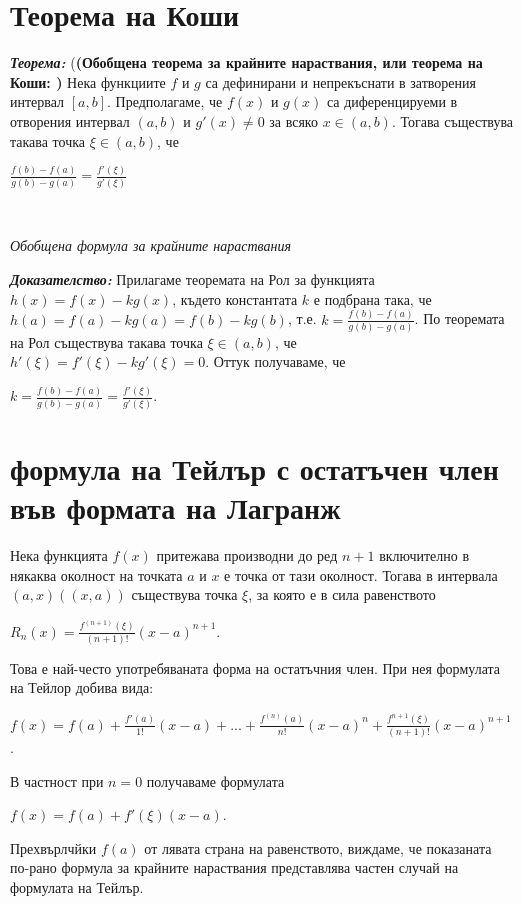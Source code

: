 \documentclass[11pt]{article} %
\newcommand{\italicBold}[1]{\textbf{\emph{#1}}}
\newcommand{\theorem}{\italicBold{Теорема: }}
\newcommand{\proof}{\italicBold{Доказателство: }}
\begin{document}
\section{Теорема на Коши}
\theorem (\textbf{(Обобщена теорема  за крайните нараствания, или теорема на Коши: )} Нека функциите $f$ и $g$ са дефинирани и непрекъснати в затворения интервал $[a,b]$. Предполагаме, че $f(x)$ и $g(x)$ са диференцируеми в отворения интервал $(a,b)$ и $g'(x) \neq 0$ за всяко $x \in (a,b)$. Тогава съществува такава точка $\xi \in (a,b)$, че \\
\centerline{$\frac{f(b)-f(a)}{g(b)-g(a)}=\frac{f'(\xi)}{g'(\xi)}$}\\
\centerline{\textit{Обобщена формула за крайните нараствания}}
\par
\proof Прилагаме теоремата на Рол за функцията $h(x)=f(x)-kg(x)$, където константата $k$ е подбрана така, че $h(a) = f(a)-kg(a)=f(b)-kg(b)$, т.е. $k = \frac{f(b)-f(a)}{g(b)-g(a)}$. По теоремата на Рол съществува такава точка $\xi \in (a,b)$, че \\$h'(\xi)=f'(\xi)-kg'(\xi)=0$. Оттук получаваме, че\\
\centerline{$k = \frac{f(b)-f(a)}{g(b)-g(a)}=\frac{f'(\xi)}{g'(\xi)}$.} 


\section{формула на Тейлър с остатъчен член във формата на Лагранж}
Нека функцията $f(x)$ притежава производни до ред $n+1$ включително в някаква околност на точката $a$ и $x$ е точка от тази околност. Тогава в интервала $(a,x)((x,a))$ съществува точка $\xi$, за която е в сила равенството \\
\centerline{$R_{n}(x) = \frac{f^{(n+1)}(\xi)}{(n+1)!}(x-a)^{n+1}$.}
\par
Това е най-често употребяваната форма на остатъчния член. При нея формулата на Тейлор добива вида:\\
\centerline{$f(x)=f(a)+\frac{f'(a)}{1!}(x-a)+...+\frac{f^{(n)}(a)}{n!}(x-a)^{n}+\frac{f^{n+1}(\xi)}{(n+1)!}(x-a)^{n+1}$.}
В частност при $n=0$ получаваме формулата \\
\centerline{$f(x)=f(a)+f'(\xi)(x-a)$.}
Прехвърлчйки $f(a)$ от лявата страна на равенството, виждаме, че показаната по-рано формула за крайните нараствания представлява частен случай на формулата на Тейлър.  

  
\end{document}
